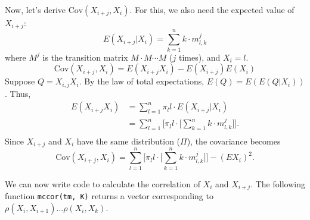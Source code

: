 \documentclass[letter]{article}
\begin{document}
Now, let's derive $\text{Cov}(X_{i+j}, X_i)$. For this, we also need the expected
value of $X_{i+j}$:
$$ E(X_{i+j} | X_i) = \sum_{k=1}^n{k \cdot m^j_{l,k}} $$
where $M^j$ is the transition matrix $M \cdot M \cdots M$ ($j$ times), and 
$X_i = l$. 
$$ \text{Cov}(X_{i+j}, X_i) = E(X_{i+j}X_i) - E(X_{i+j})E(X_i) $$
Suppose $Q = X_{i,j}X_i$. By the law of total expectations, $ E(Q) = E(E(Q|X_i))$.
Thus, 
\begin{equation*}
  \begin{aligned}
    E(X_{i+j}X_i) &= \sum_{l=1}^n{ \pi_l l \cdot E(X_{i+j} | X_i)} \\
                  &= \sum_{l=1}^n{ \Bigg[ \pi_l l \cdot \Big[ 
                         \sum_{k=1}^n{k \cdot m^j_{l,k}} \Big]} \Bigg]. \\
  \end{aligned}
\end{equation*}
Since $X_{i+j}$ and $X_i$ have the same distribution ($\Pi$), the covariance becomes
$$ \text{Cov}(X_{i+j}, X_i) =  \sum_{l=1}^n{ \Bigg[ \pi_l l \cdot \Big[ 
                                     \sum_{k=1}^n{k \cdot m^j_{l,k}} \Big]} \Bigg]
                              - (EX_i)^2.$$

We can now write code to calculate the correlation of $X_i$ and $X_{i+j}$. The following
function \texttt{mccor(tm, K)} returns a vector corresponding to 
$\rho(X_i, X_{i+1}) \dots \rho(X_i, X_k)$. 

\lstset{
  basicstyle=\small,
  stringstyle=\ttfamily,
  numbers=left,
  numberstyle=\tiny,
  stepnumber=1, 
  numbersep=5pt,
  language=R }


\end{document}
